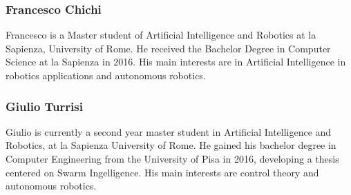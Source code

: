 \documentclass{llncs}
\begin{document}
\subsubsection*{Francesco Chichi}
Francesco is a Master student of Artificial Intelligence and Robotics at la Sapienza, University of Rome. He received the Bachelor Degree in Computer Science at la Sapienza in 2016. His main interests are in Artificial Intelligence in robotics applications and autonomous robotics.

\subsubsection*{Giulio Turrisi}
Giulio is currently a second year master student in Artificial Intelligence and Robotics, at la Sapienza University of Rome. He gained his bachelor degree in Computer Engineering from the University of Pisa in 2016, developing a thesis centered on Swarm Ingelligence. His main interests are control theory and autonomous robotics.

\end{document}
